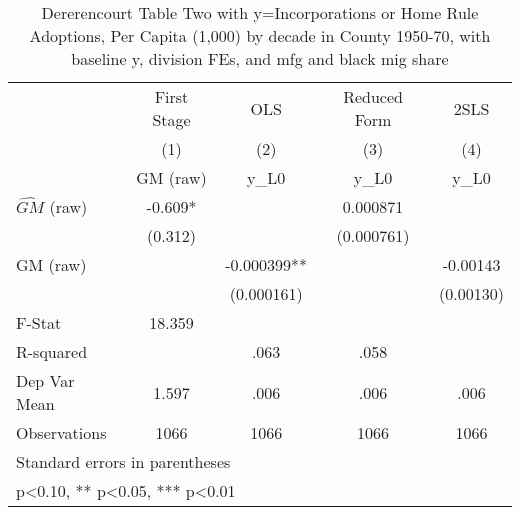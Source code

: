 \begin{table}[htbp]\centering
\def\sym#1{\ifmmode^{#1}\else\(^{#1}\)\fi}
\caption{Dererencourt Table Two with y=Incorporations or Home Rule Adoptions, Per Capita (1,000) by decade in County 1950-70, with baseline y, division FEs, and mfg and black mig share}
\begin{tabular}{l*{4}{c}}
\toprule
                    & First Stage   &         OLS   &Reduced Form   &        2SLS   \\
                    &\multicolumn{1}{c}{(1)}&\multicolumn{1}{c}{(2)}&\multicolumn{1}{c}{(3)}&\multicolumn{1}{c}{(4)}\\
                    &\multicolumn{1}{c}{GM  (raw)}&\multicolumn{1}{c}{y\_L0}&\multicolumn{1}{c}{y\_L0}&\multicolumn{1}{c}{y\_L0}\\
\midrule
$\hat{GM}$ (raw)    &      -0.609*  &               &    0.000871   &               \\
                    &     (0.312)   &               &  (0.000761)   &               \\
\addlinespace
GM  (raw)           &               &   -0.000399** &               &    -0.00143   \\
                    &               &  (0.000161)   &               &   (0.00130)   \\
\midrule
F-Stat              &      18.359   &               &               &               \\
R-squared           &               &        .063   &        .058   &               \\
Dep Var Mean        &       1.597   &        .006   &        .006   &        .006   \\
Observations        &        1066   &        1066   &        1066   &        1066   \\
\bottomrule
\multicolumn{5}{l}{\footnotesize Standard errors in parentheses}\\
\multicolumn{5}{l}{\footnotesize * p<0.10, ** p<0.05, *** p<0.01}\\
\end{tabular}
\end{table}
